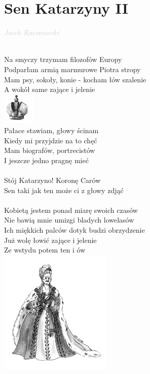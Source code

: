 \documentclass[a5paper, 10pt]{book}
\begin{document}
\newpage
\section{Sen Katarzyny II}\textcolor{lightgray}{\textit{Jacek Kaczmarski}}\\~\\
\begin{minipage}[t]{0.85\textwidth}
  Na smyczy trzymam filozofów Europy\\
  Podparłam armią marmurowe Piotra stropy\\
  Mam psy, sokoły, konie - kocham łów szalenie\\
  A wokół same zające i jelenie\\
  \hspace*{6cm}\includegraphics[height=1.5cm]{images/sen_katarzyny_1.png}\vspace*{-1.6cm}\\
  Pałace stawiam, głowy ścinam\\
  Kiedy mi przyjdzie na to chęć\\
  Mam biografów, portrecistów\\
  I jeszcze jedno pragnę mieć\\
  \\
  \hspace*{5mm}Stój Katarzyno! Koronę Carów\\
  \hspace*{5mm}Sen taki jak ten może ci z głowy zdjąć\\
  \\
  Kobietą jestem ponad miarę swoich czasów\\
  Nie bawią mnie umizgi bladych lowelasów\\
  Ich miękkich palców dotyk budzi obrzydzenie\\
  Już wolę łowić zające i jelenie\\
  Ze wstydu potem ten i ów\\
  \hspace*{6cm}\includegraphics[height=6cm]{images/sen_katarzyny_2.png}\vspace*{-6.1cm}\\

\end{minipage}
\end{document}
